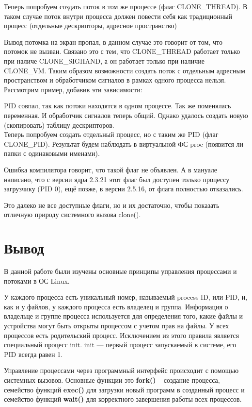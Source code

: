 \documentclass[a4paper]{article}
\begin{document}
	Теперь попробуем создать поток в том же процессе (флаг CLONE\_THREAD). В таком случае поток внутри процесса должен повести себя как традиционный процесс (отдельные дескрипторы, адресное пространство)
	
	Вывод потомка на экран пропал, в данном случае это говорит от том, что потомок не вызван. Связано это с тем, что CLONE\_THREAD работает только при наличе CLONE\_SIGHAND, а он работает только при наличие CLONE\_VM. Таким образом возможности создать поток с отдельным адресным пространством и обработчиком сигналов в рамках одного процесса нельзя. Рассмотрим пример, добавив эти зависимости:
	
	PID совпал, так как потоки находятся в одном процессе. Так же поменялась переменная. И обработчик сигналов теперь общий. Однако удалось создать новую (скопировать) таблицу дескрипторов.\\

	Теперь попробуем создать отдельный процесс, но с таким же PID (флаг CLONE\_PID). Результат будем наблюдать в виртуальной ФС proc (появится ли папки с одинаковыми именами).
	
	Ошибка компилятора говорит, что такой флаг не объявлен. А в мануале написано, что с версии ядра 2.3.21 этот флаг был доступен только процессу загрузчику (PID 0), ещё позже, в версии 2.5.16, от флага полностью отказались.
	
	Это далеко не все доступные флаги, но и их достаточно, чтобы показать отличную природу системного вызова clone().
\section{Вывод}
	В данной работе были изучены основные принципы управления процессами и потоками в ОС Linux. 
	
	У каждого процесса есть уникальный номер, называемый process ID, или PID, и, как и у файлов, у каждого процесса есть владелец и группа. Информация о владельце и группе процесса используется для определения того, какие файлы и устройства могут быть открыты процессом с учетом прав на файлы. У всех процессов есть родительский процесс. Исключением из этого правила является специальный процесс init. init --- первый процесс запускаемый в системе, его PID всегда равен 1.
	
	Управление процессами через программный интерфейс происходит с помощью системных вызовов. Основные функции это \textbf{fork()} -- создание процесса, семейство функций \textbf{exec()} для загрузки новый программ в созданный процесс и семейство функций \textbf{wait()} для корректного завершения работы всех процессов.
	
\end{document}
